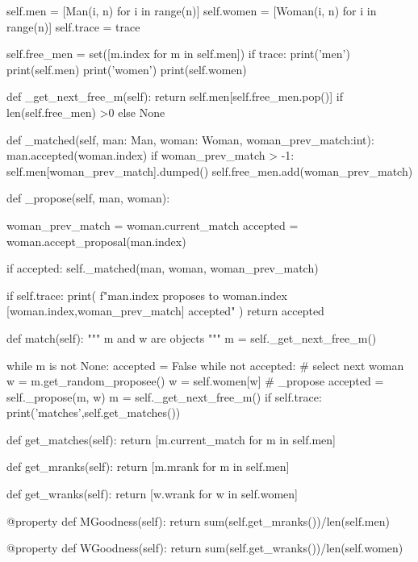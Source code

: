 \documentclass{homeworg}
\begin{document}
\begin{python}
        self.men = [Man(i, n) for i in range(n)]
        self.women = [Woman(i, n) for i in range(n)]
        self.trace = trace
        
        self.free_men = set([m.index for m in self.men])
        if trace:
            print('men')
            print(self.men)
            print('women')
            print(self.women)

    def _get_next_free_m(self):
        return self.men[self.free_men.pop()] if len(self.free_men) >0 else None

    def _matched(self, man: Man, woman: Woman, woman_prev_match:int):
        man.accepted(woman.index)
        if woman_prev_match > -1:
            self.men[woman_prev_match].dumped()
            self.free_men.add(woman_prev_match)


    def _propose(self, man, woman):

        woman_prev_match = woman.current_match
        accepted = woman.accept_proposal(man.index)

        if accepted:
            self._matched(man, woman, woman_prev_match)

        if self.trace:
            print(
                f"{man.index} proposes to {woman.index} [{woman.index},{woman_prev_match}] {accepted}"
            )
        return accepted

    def match(self):
        """
        m and w are objects
        """
        m = self._get_next_free_m()
        
        while m is not None:
            accepted = False
            while not accepted:
                # select next woman
                w = m.get_random_proposee()
                w = self.women[w]
                # _propose
                accepted = self._propose(m, w)
            m = self._get_next_free_m()
        if self.trace:
            print('matches\n',self.get_matches())

    def get_matches(self):
        return [m.current_match for m in self.men]

    def get_mranks(self):
        return [m.mrank for m in self.men]
    
    
    def get_wranks(self):
        return [w.wrank for w in self.women]

    @property
    def MGoodness(self):
        return sum(self.get_mranks())/len(self.men)
    
    @property
    def WGoodness(self):
        return sum(self.get_wranks())/len(self.women)
        

\end{python}
\end{document}
